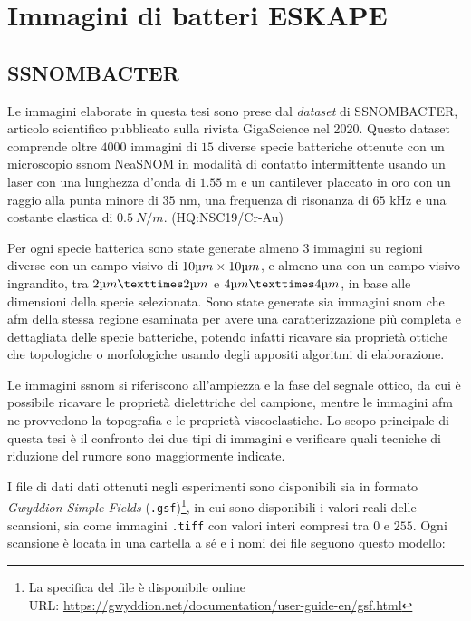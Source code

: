 \documentclass[../main.tex]{subfiles}
\begin{document}
\chapter{Immagini di batteri ESKAPE}

\section{SSNOMBACTER}

Le immagini elaborate in questa tesi sono prese dal \textit{dataset} di SSNOMBACTER, articolo scientifico pubblicato sulla rivista  GigaScience nel 2020.\cite{ssnombacter} Questo dataset comprende oltre $4000$ immagini di $15$ diverse specie batteriche ottenute con un microscopio \acrshort{ssnom} NeaSNOM in modalità di contatto intermittente usando un laser con una lunghezza d'onda di $1.55$ \micro m  e un cantilever placcato in oro con un raggio alla punta minore di $35$ nm, una frequenza di risonanza di $65$ kHz e una costante elastica di $0.5\ N/m$. (HQ:NSC19/Cr-Au) \cite{micromasch}

Per ogni specie batterica sono state generate almeno 3 immagini su regioni diverse con un campo visivo di $10 \micro m \times 10 \micro m$, e almeno una con un campo visivo ingrandito, tra $2 \micro m × 2 \micro m$ e $4 \micro m × 4 \micro m$, in base alle dimensioni della specie selezionata. Sono state generate sia immagini \acrshort{snom} che \acrshort{afm} della stessa regione esaminata per avere una caratterizzazione più completa e dettagliata delle specie batteriche, potendo infatti ricavare sia proprietà ottiche che topologiche o morfologiche usando degli appositi algoritmi di elaborazione. 

Le immagini \acrshort{ssnom} si riferiscono all'ampiezza e la fase del segnale ottico, da cui è possibile ricavare le proprietà dielettriche del campione, mentre le immagini \acrshort{afm} ne provvedono la topografia e le proprietà viscoelastiche. Lo scopo principale di questa tesi è il confronto dei due tipi di immagini e verificare quali tecniche di riduzione del rumore sono maggiormente indicate.

I file di dati dati ottenuti negli esperimenti sono disponibili sia in formato \textit{Gwyddion Simple Fields}\cite{gwyddion} (\texttt{.gsf})\footnote{La specifica del file è disponibile online\\URL: \url{https://gwyddion.net/documentation/user-guide-en/gsf.html}}, in cui sono disponibili i valori reali delle scansioni, sia come immagini \texttt{.tiff} con valori interi compresi tra $0$ e $255$. Ogni scansione è locata in una cartella a sé e i nomi dei file seguono questo modello:
\end{document}
